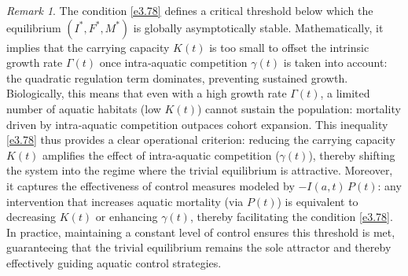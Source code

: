 \documentclass[10pt, a4paper]{amsart}
\theoremstyle{plain}
\theoremstyle{definition}
\theoremstyle{remark}
\newtheorem{remark}[lemma]{Remark}
\numberwithin{equation}{section}
\begin{document}
\begin{remark}
The condition \eqref{e3.78} defines a critical threshold below which the equilibrium $(I^*,F^*,M^*)$ is globally asymptotically stable. Mathematically, it implies that the carrying capacity $K(t)$ is too small to offset the intrinsic growth rate $\Gamma(t)$ once intra‑aquatic competition $\gamma(t)$ is taken into account: the quadratic regulation term dominates, preventing sustained growth. Biologically, this means that even with a high growth rate $\Gamma(t)$, a limited number of aquatic habitats (low $K(t)$) cannot sustain the population: mortality driven by intra‑aquatic competition outpaces cohort expansion. This inequality \eqref{e3.78} thus provides a clear operational criterion: reducing the carrying capacity $K(t)$ amplifies the effect of intra‑aquatic competition ($\gamma(t)$), thereby shifting the system into the regime where the trivial equilibrium is attractive. Moreover, it captures the effectiveness of control measures modeled by $-I(a,t)\,P(t)$: any intervention that increases aquatic mortality (via $P(t)$) is equivalent to decreasing $K(t)$ or enhancing $\gamma(t)$, thereby facilitating the condition \eqref{e3.78}. In practice, maintaining a constant level of control ensures this threshold is met, guaranteeing that the trivial equilibrium remains the sole attractor and thereby effectively guiding aquatic control strategies.
\end{remark}
\end{document}

